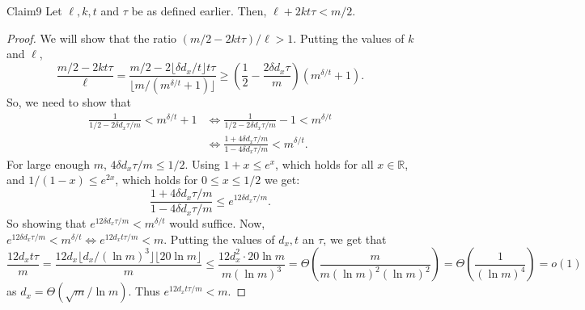 \begin{authorclaim}{Claim9}
Let $\ell,k,t$ and $\tau$ be as defined earlier. Then, $\ell+2kt\tau<m/2$.
\end{authorclaim}
\begin{proof}
We will show that the ratio $(m/2-2kt\tau)/\ell>1$. Putting the values of $k$ and $\ell$,
\[
\frac{m/2-2kt\tau}{\ell}
=\frac{m/2-2\lfloor\delta d_x/t\rfloor t\tau}{\lfloor m/(m^{\delta/t}+1)\rfloor}
\ge\left(\frac12-\frac{2\delta d_x\tau}{m}\right)(m^{\delta/t}+1).
\]
So, we need to show that
\begin{align*}
\frac1{1/2-2\delta d_x\tau/m}<m^{\delta/t}+1
&\Longleftrightarrow\frac1{1/2-2\delta d_x\tau/m}-1<m^{\delta/t}\\
&\Longleftrightarrow\frac{1+4\delta d_x\tau/m}{1-4\delta d_x\tau/m}<m^{\delta/t}.
\end{align*}
For large enough $m$, $4\delta d_x\tau/m\le1/2$. Using $1+x\le e^x$, which holds for all $x\in\mathbb R$, and $1/(1-x)\le e^{2x}$, which holds for $0\le x\le1/2$ we get:
\[
\frac{1+4\delta d_x\tau/m}{1-4\delta d_x\tau/m}\le e^{12\delta d_x\tau/m}.
\]
So showing that $e^{12\delta d_x\tau/m}<m^{\delta/t}$ would suffice. Now,
$e^{12\delta d_x\tau/m}<m^{\delta/t}\Longleftrightarrow e^{12d_xt\tau/m}<m$.
Putting the values of $d_x,t$ an $\tau$, we get that
\[
\frac{12d_xt\tau}{m}
=\frac{12d_x\lfloor d_x/(\ln m)^3\rfloor\lfloor20\ln m\rfloor}{m}
\le\frac{12d_x^2\cdot20\ln m}{m(\ln m)^3}
=\Theta\left(\frac m{m(\ln m)^2(\ln m)^2}\right)
=\Theta\left(\frac1{(\ln m)^4}\right)=o(1)
\]
as $d_x=\Theta(\sqrt m/\ln m)$. Thus $e^{12d_xt\tau/m}<m$.
\end{proof}
